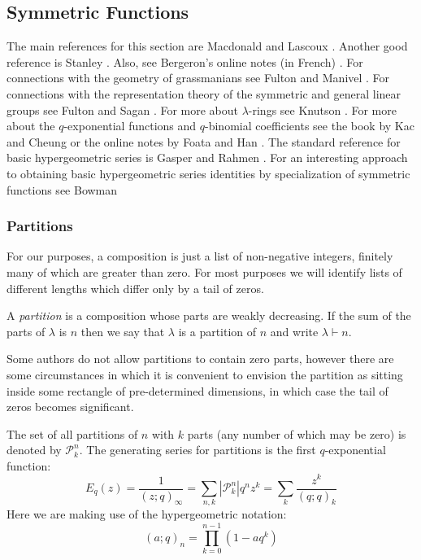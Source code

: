\documentclass[12pt,dvips]{amsart}
\begin{document}
\subsection{Symmetric Functions}

The main references for this section are Macdonald \cite{BLACK} and Lascoux \cite {LASCOUX}. Another good reference is Stanley \cite{STANLEY}. Also, see Bergeron's online notes (in French) \cite{BERG}. For connections with the geometry of grassmanians see Fulton \cite{BLUE} and Manivel \cite{MANIVEL}. For connections with the representation theory of the symmetric and general linear groups see Fulton \cite{BLUE} and Sagan \cite{SAGAN}. For more about $\lambda$-rings see Knutson \cite{KNUTSON}. For more about the $q$-exponential functions and $q$-binomial coefficients see the book by Kac and Cheung \cite{KAC} or the online notes by Foata and Han \cite{FOAT}. The standard reference for basic hypergeometric series is Gasper and Rahmen \cite{HYPGEOM}. For an interesting approach to obtaining basic hypergeometric series identities by specialization of symmetric functions see Bowman \cite{BOWMAN}

\subsubsection{Partitions}\label{partitions}

For our purposes, a composition is just a list of non-negative integers, finitely many of which are greater than zero. For most purposes we will identify lists of different lengths which differ only by a tail of zeros. 

A {\it partition} is a composition whose parts are weakly decreasing. If the sum of the parts of $\lambda$ is $n$ then we say that $\lambda$ is a partition of $n$ and write $\lambda \vdash n$. 

Some authors do not allow partitions to contain zero parts, however there are some circumstances in which it is convenient to envision the partition as sitting inside some rectangle of pre-determined dimensions, in which case the tail of zeros becomes significant.

\par\bigskip
The set of all partitions of $n$ with $k$ parts (any number of which may be zero) is denoted by $\mathcal{P}_k^n$. The generating series for partitions is the first $q$-exponential function:
$$ E_q(z) = \frac{1}{(z;q)_\infty} = \sum_{n,k} |\mathcal{P}_k^n| q^n z^k = \sum_k \frac{z^k}{(q;q)_k}$$
Here we are making use of the hypergeometric notation:
$$ (a;q)_n = \prod_{k=0}^{n-1} (1-aq^k) $$
\end{document}
